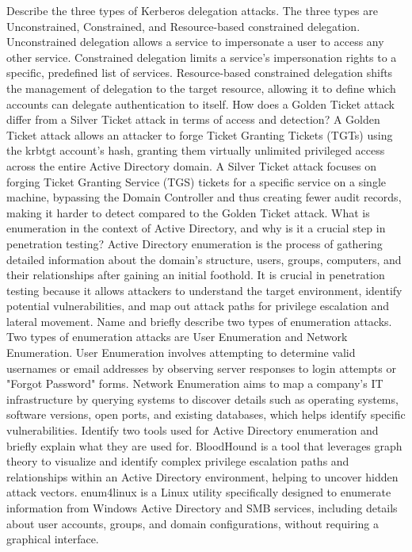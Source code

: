 Describe the three types of Kerberos delegation attacks. The three types are Unconstrained, Constrained, and Resource-based constrained delegation. Unconstrained delegation allows a service to impersonate a user to access any other service. Constrained delegation limits a service's impersonation rights to a specific, predefined list of services. Resource-based constrained delegation shifts the management of delegation to the target resource, allowing it to define which accounts can delegate authentication to itself.
How does a Golden Ticket attack differ from a Silver Ticket attack in terms of access and detection? A Golden Ticket attack allows an attacker to forge Ticket Granting Tickets (TGTs) using the krbtgt account's hash, granting them virtually unlimited privileged access across the entire Active Directory domain. A Silver Ticket attack focuses on forging Ticket Granting Service (TGS) tickets for a specific service on a single machine, bypassing the Domain Controller and thus creating fewer audit records, making it harder to detect compared to the Golden Ticket attack.
What is enumeration in the context of Active Directory, and why is it a crucial step in penetration testing? Active Directory enumeration is the process of gathering detailed information about the domain's structure, users, groups, computers, and their relationships after gaining an initial foothold. It is crucial in penetration testing because it allows attackers to understand the target environment, identify potential vulnerabilities, and map out attack paths for privilege escalation and lateral movement.
Name and briefly describe two types of enumeration attacks. Two types of enumeration attacks are User Enumeration and Network Enumeration. User Enumeration involves attempting to determine valid usernames or email addresses by observing server responses to login attempts or "Forgot Password" forms. Network Enumeration aims to map a company's IT infrastructure by querying systems to discover details such as operating systems, software versions, open ports, and existing databases, which helps identify specific vulnerabilities.
Identify two tools used for Active Directory enumeration and briefly explain what they are used for. BloodHound is a tool that leverages graph theory to visualize and identify complex privilege escalation paths and relationships within an Active Directory environment, helping to uncover hidden attack vectors. enum4linux is a Linux utility specifically designed to enumerate information from Windows Active Directory and SMB services, including details about user accounts, groups, and domain configurations, without requiring a graphical interface.
